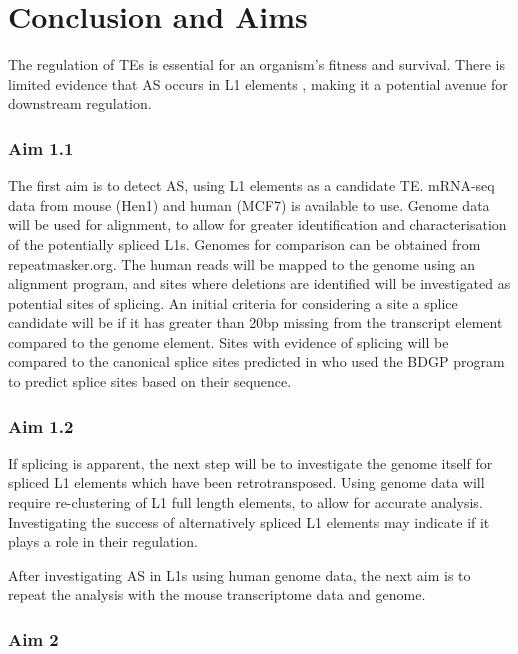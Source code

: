 \documentclass[12pt]{article}
\begin{document}
	\section{Conclusion and Aims}
	
		The regulation of TEs is essential for an organism's fitness and survival.
		There is limited evidence that AS occurs in L1 elements \citep{Belancio06}, making it a potential avenue for downstream regulation. 
		
		\subsubsection*{Aim 1.1}
		
		The first aim is to detect AS, using L1 elements as a candidate TE.
		mRNA-seq data from mouse (Hen1) and human (MCF7) is available to use.
		Genome data will be used for alignment, to allow for greater identification and characterisation of the potentially spliced L1s.
		Genomes for comparison can be obtained from repeatmasker.org.
		The human reads will be mapped to the genome using an alignment program, and sites where deletions are identified will be investigated as potential sites of splicing.
		An initial criteria for considering a site a splice candidate will be if it has greater than 20bp missing from the transcript element compared to the genome element.
		Sites with evidence of splicing will be compared to the canonical splice sites predicted in \citep{Belancio06} who used the BDGP program to predict splice sites based on their sequence. 
		
		\subsubsection*{Aim 1.2}
				
		If splicing is apparent, the next step will be to investigate the genome itself for spliced L1 elements which have been retrotransposed.
		Using genome data will require re-clustering of L1 full length elements, to allow for accurate analysis.
		Investigating the success of alternatively spliced L1 elements may indicate if it plays a role in their regulation. 
		
		
		After investigating AS in L1s using human genome data, the next aim is to repeat the analysis with the mouse transcriptome data and genome.
		
		\subsubsection*{Aim 2}
		
\end{document}
